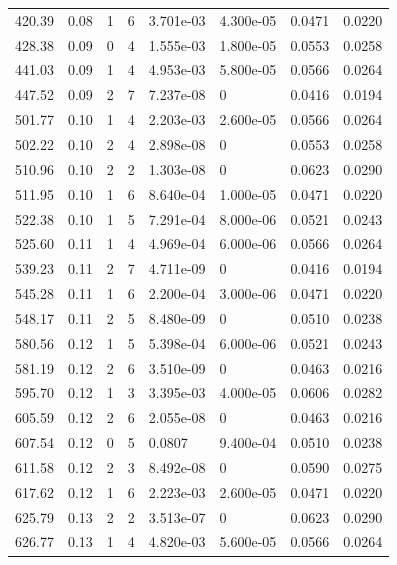 \documentclass[preview]{standalone}
\begin{document}
{{{\begin{tabular}{L{1.2cm}C{1.2cm} C{0.3cm}C{0.5cm} C{1.4cm}C{1.4cm} C{1.4cm}C{1.4cm}}
  420.39  &  0.08  & 1     &  6 &  3.701e-03  & 4.300e-05  & 0.0471 &  0.0220   \\ 
  428.38  &  0.09  & 0     &  4 &  1.555e-03  & 1.800e-05  & 0.0553 &  0.0258   \\ 
  441.03  &  0.09  & 1     &  4 &  4.953e-03  & 5.800e-05  & 0.0566 &  0.0264   \\ 
  447.52  &  0.09  & 2     &  7 &  7.237e-08  & 0  & 0.0416 &  0.0194   \\ 
  501.77  &  0.10  & 1     &  4 &  2.203e-03  & 2.600e-05  & 0.0566 &  0.0264   \\ 
  502.22  &  0.10  & 2     &  4 &  2.898e-08  & 0  & 0.0553 &  0.0258   \\ 
  510.96  &  0.10  & 2     &  2 &  1.303e-08  & 0  & 0.0623 &  0.0290   \\ 
  511.95  &  0.10  & 1     &  6 &  8.640e-04  & 1.000e-05  & 0.0471 &  0.0220   \\ 
  522.38  &  0.10  & 1     &  5 &  7.291e-04  & 8.000e-06  & 0.0521 &  0.0243   \\ 
  525.60  &  0.11  & 1     &  4 &  4.969e-04  & 6.000e-06  & 0.0566 &  0.0264   \\ 
  539.23  &  0.11  & 2     &  7 &  4.711e-09  & 0  & 0.0416 &  0.0194   \\ 
  545.28  &  0.11  & 1     &  6 &  2.200e-04  & 3.000e-06  & 0.0471 &  0.0220   \\ 
  548.17  &  0.11  & 2     &  5 &  8.480e-09  & 0  & 0.0510 &  0.0238   \\ 
  580.56  &  0.12  & 1     &  5 &  5.398e-04  & 6.000e-06  & 0.0521 &  0.0243   \\ 
  581.19  &  0.12  & 2     &  6 &  3.510e-09  & 0  & 0.0463 &  0.0216   \\ 
  595.70  &  0.12  & 1     &  3 &  3.395e-03  & 4.000e-05  & 0.0606 &  0.0282   \\ 
  605.59  &  0.12  & 2     &  6 &  2.055e-08  & 0  & 0.0463 &  0.0216   \\ 
  607.54  &  0.12  & 0     &  5 &  0.0807  & 9.400e-04  & 0.0510 &  0.0238   \\ 
  611.58  &  0.12  & 2     &  3 &  8.492e-08  & 0  & 0.0590 &  0.0275   \\ 
  617.62  &  0.12  & 1     &  6 &  2.223e-03  & 2.600e-05  & 0.0471 &  0.0220   \\ 
  625.79  &  0.13  & 2     &  2 &  3.513e-07  & 0  & 0.0623 &  0.0290   \\ 
  626.77  &  0.13  & 1     &  4 &  4.820e-03  & 5.600e-05  & 0.0566 &  0.0264   \\ 

\end{tabular}}}}
\end{document}
